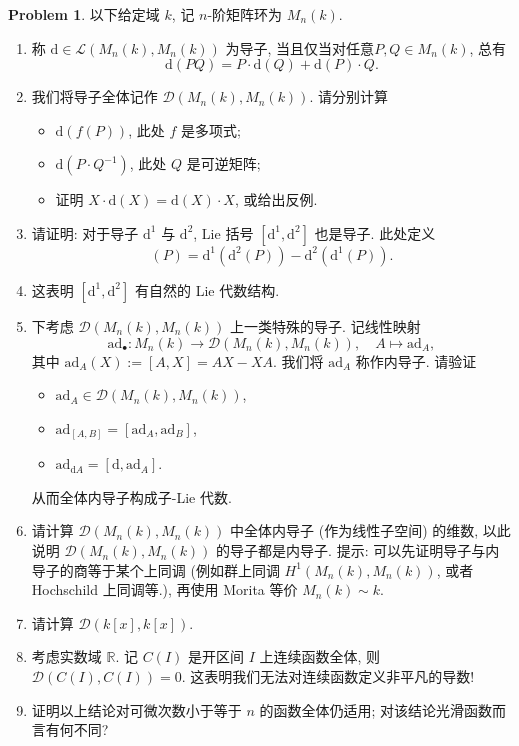 \documentclass{MainStyle}
\theoremstyle{definition}
\newtheorem{problem}{Problem}
\begin{document}
\begin{problem}
以下给定域 $k$, 记 $n$-阶矩阵环为 $M_n(k)$.
\begin{enumerate}
    \item 称 $\mathrm d\in \mathcal L(M_n(k),M_n(k))$ 为导子, 当且仅当对任意​ $P,Q\in M_n(k)$, 总有
          \begin{equation}
              \mathrm d(PQ)=P\cdot \mathrm d(Q)+\mathrm d(P)\cdot Q.
          \end{equation}
    \item 我们将导子全体记作 $\mathcal D(M_n(k),M_n(k))$. 请分别计算
          \begin{itemize}
              \item $\mathrm{d}(f(P))$, 此处 $f$ 是多项式;
              \item $\mathrm{d}(P\cdot Q^{-1})$, 此处 $Q$ 是可逆矩阵;
              \item 证明 $X\cdot \mathrm d(X)=\mathrm d(X)\cdot X$, 或给出反例.
          \end{itemize}
    \item 请证明: 对于导子 $\mathrm d^1$ 与 $\mathrm d^2$, Lie 括号 $[\mathrm d^1,\mathrm d^2]$ 也是导子. 此处定义
          \begin{equation}
              [\mathrm d^1,\mathrm d^2](P)=\mathrm d^1(\mathrm d^2 (P))-\mathrm d^2(\mathrm d^1(P)).
          \end{equation}
    \item 这表明 $[\mathrm d^1,\mathrm d^2]$ 有自然的 Lie 代数结构.
    \item 下考虑 $\mathcal D(M_n(k),M_n(k))$ 上一类特殊的导子. 记线性映射
          \begin{equation}
              \mathrm{ad}_\bullet :M_n(k)\to \mathcal D(M_n(k),M_n(k)),\quad A\mapsto \mathrm{ad}_A,
          \end{equation}
          其中 $\mathrm{ad}_A(X):=[A,X]=AX-XA$. 我们将 $\mathrm{ad}_A$ 称作内导子. 请验证
          \begin{itemize}
              \item $\mathrm{ad}_A\in \mathcal D(M_n(k),M_n(k))$,
              \item $\mathrm{ad}_{[A,B]}=[\mathrm{ad}_A,\mathrm{ad}_B]$,
              \item $\mathrm{ad}_{\mathrm dA}=[\mathrm d,\mathrm{ad}_A]$.
          \end{itemize}
          从而全体内导子构成子-Lie 代数.
    \item 请计算 $\mathcal D(M_n(k),M_n(k))$ 中全体内导子 (作为线性子空间) 的维数, 以此说明 $\mathcal D(M_n(k),M_n(k))$ 的导子都是内导子. 提示: 可以先证明导子与内导子的商等于某个上同调 (例如群上同调 $H^1(M_n(k),M_n(k))$, 或者 Hochschild 上同调等.), 再使用 Morita 等价 $M_n(k)\sim k$.
    \item 请计算 $\mathcal D(k[x],k[x])$.
    \item 考虑实数域 $\mathbb R$. 记 $C(I)$ 是开区间 $I$ 上连续函数全体, 则 $\mathcal D(C(I),C(I))=0$. 这表明我们无法对连续函数定义非平凡的导数!
    \item 证明以上结论对可微次数小于等于 $n$ 的函数全体仍适用; 对该结论光滑函数而言有何不同?
\end{enumerate}
\end{problem}
\end{document}

